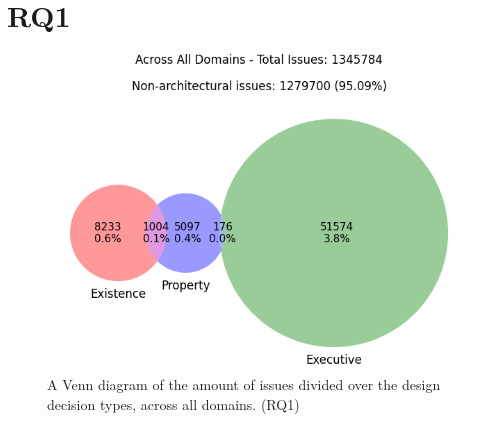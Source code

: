 \documentclass[10pt,a4paper,twocolumn]{article}
\begin{document}
\newcommand{\domaintable}[3]{
\begin{#3}[]
    \centering

    \caption{Chi-squared test results on the \textit{#2} characteristic per domain, high-confidence architectural issues only. (RQ2) (CM = Content Management, DSP = Data Storage and Processing, DC = DevOps and Cloud, SOAM = SOA and Middlewares, SDT = Software Development Tools, WD = Web Development)}
    \label{tab:rq2_#1}
\end{#3}
}

\newcommand{\chithreeone}[2]{
\begin{table}[]
    \centering
    \small

    \caption{Chi-squared test results for the relation between the \textit{#2} issue characteristic and \textbf{intersected} decision type contained in the issue. (CM = Content Management, DSP = Data Storage and Processing, DC = DevOps and Cloud, SOAM = SOA and Middlewares, SDT = Software Development Tools, WD = Web Development)}
    \label{tab:rq3_#1_intersected}
\end{table}
}
\newcommand{\chithreetwo}[2]{
\begin{table}[]
    \centering
    \small

    \caption{Chi-squared test results for the relation between the \textit{#2} issue characteristic and \textbf{simple} decision type contained in the issue. (CM = Content Management, DSP = Data Storage and Processing, DC = DevOps and Cloud, SOAM = SOA and Middlewares, SDT = Software Development Tools, WD = Web Development)}
    \label{tab:rq3_#1_simple}
\end{table}
}

\section{RQ1}

\begin{figure}[H]
    \centering
    \includegraphics[width=\linewidth]{rq1/total_counts_high_conf.png}
    \caption{A Venn diagram of the amount of issues divided over the design decision types, across all domains. (RQ1)}
    \label{fig:rq1_totals}
  \end{figure}
\end{document}
